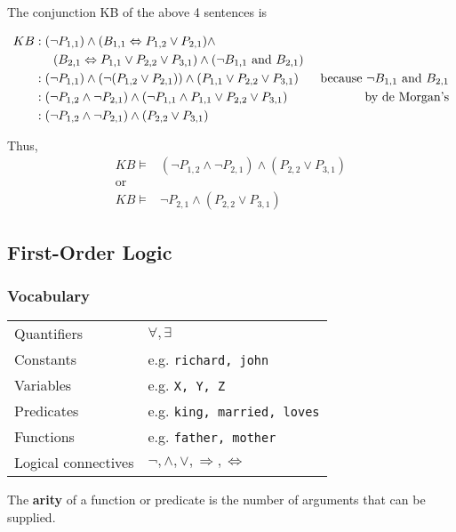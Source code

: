 The conjunction KB of the above 4 sentences is


\begin{align*}
    KB&: (\neg P_{1,1}) \land (B_{1,1} \Leftrightarrow P_{1,2} \lor
          P_{2,1}) \land\\
      &  \indent (B_{2,1} \Leftrightarrow P_{1,1} \lor P_{2,2} \lor P_{3,1}) \land
          (\neg B_{1,1} \text{ and } B_{2,1})\\
      &: (\neg P_{1,1}) \land (\neg (P_{1,2} \lor P_{2,1})) \land (P_{1,1}
         \lor P_{2,2} \lor P_{3,1}) & \text{ because } \neg B_{1,1} \text{ and }
         B_{2,1}\\
      &: (\neg P_{1,2} \land \neg P_{2,1}) \land (\neg P_{1,1} \land P_{1,1}
         \lor P_{2,2} \lor P_{3,1}) & \text{ by de Morgan's}\\
      &: (\neg P_{1,2} \land \neg P_{2,1}) \land (P_{2,2} \lor P_{3,1})
\end{align*}

Thus,
\begin{align*}
    KB \models&(\neg P_{1,2} \land \neg P_{2,1}) \land (P_{2,2} \lor P_{3,1})\\
    \text{or}\\
    KB \models&\neg P_{2,1} \land (P_{2,2} \lor P_{3,1})
\end{align*}

\subsection{First-Order Logic}
\subsubsection{Vocabulary}
\begin{tabular}{l l}
    Quantifiers         & $\forall, \exists$\\
    Constants           & e.g. \texttt{richard, john}\\
    Variables           & e.g. \texttt{X, Y, Z}\\
    Predicates          & e.g. \texttt{king, married, loves}\\
    Functions           & e.g. \texttt{father, mother}\\
    Logical connectives & $\neg, \land, \lor, \Rightarrow, \Leftrightarrow$\\
\end{tabular}

The \textbf{arity} of a function or predicate is the number of arguments that
can be supplied.

